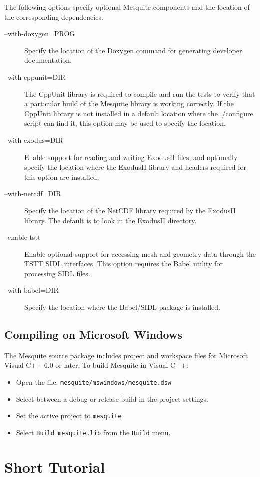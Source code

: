 The following options specify optional Mesquite components and the location 
of the corresponding dependencies.
\begin{description}
\item[--with-doxygen=PROG] Specify the location of the Doxygen
command for generating developer documentation.
\item[--with-cppunit=DIR]  The CppUnit library is required to compile
and run the tests to verify that a particular build of the Mesquite library
is working correctly.  If the CppUnit library is not installed in a default location
where the ./configure script can find it, this option may be used to specify
the location.
\item[--with-exodus=DIR]  Enable support for reading and writing
ExodusII files, and optionally specify the location where the ExodusII library
and headers required for this option are installed.
\item[--with-netcdf=DIR]  Specify the location of the NetCDF library
required by the ExodusII library.  The default is to look in the ExodusII
directory.
\item[--enable-tstt]  Enable optional support for accessing mesh
and geometry data through the TSTT SIDL interfaces.  This option requires
the Babel utility for processing SIDL files.
\item[--with-babel=DIR]  Specify the location where the Babel/SIDL
package is installed.
\end{description}

\subsection{Compiling on Microsoft Windows}
The Mesquite source package includes project and workspace files for Microsoft Visual C++ 6.0 or later.  To build Mesquite in Visual C++:
\begin{itemize}
\item Open the file: \texttt{mesquite/mswindows/mesquite.dsw}
\item Select between a debug or release build in the project settings.  
\item Set the active project to \texttt{mesquite}
\item Select \texttt{Build mesquite.lib} from the \texttt{Build} menu.
\end{itemize}

\section{Short Tutorial}

